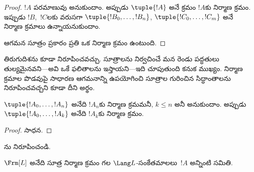 \documentclass[../../../include/open-logic-section]{subfiles}
\begin{document}
\begin{proof}
$!A$ పరమాణువు అనుకుందాం. అప్పుడు $\tuple{!A}$ అనే క్రమం $!A$కు
నిర్మాణ క్రమం.
%
ఇప్పుడు $!B$,~$!C$లకు వరుసగా $\tuple{!B_0,\dotsc,!B_n}$,
$\tuple{!C_0,\dotsc,!C_m}$ అనే నిర్మాణ క్రమాలు ఉన్నాయనుకుందాం.
%
\begin{enumerate}
\end{enumerate}
 ఆగమన సూత్రం ప్రకారం ప్రతి  ఒక నిర్మాణ
క్రమం ఉంటుంది.
\end{proof}

తిరుగుదిశను కూడా నిరూపించవచ్చు. సూత్రాలను నిర్వచించే మన రెండు
పద్ధతులు తుల్యమైనవని---అవి ఒకే ఫలితాలను ఇస్తాయని---ఇది చూపుతుంది
కనుక ముఖ్యం. నిర్మాణ క్రమాల పొడవుపై సాధారణ ఆగమనాన్ని ఉపయోగించి
సూత్రాల గురించిన సిద్ధాంతాలను నిరూపించవచ్చని కూడా దీని అర్థం.

\begin{lem}
$\tuple{!A_0,\dotsc,!A_n}$ అనేది $!A_n$కు నిర్మాణ క్రమమనీ,
$k \leq n$ అనీ అనుకుందాం. అప్పుడు $\tuple{!A_0,\dotsc,!A_k}$
అనేది $!A_k$కు నిర్మాణ క్రమం.
\end{lem}

\begin{proof}
సాధన.
\end{proof}

\begin{prob}
ను నిరూపించండి.
\end{prob}

\begin{thm}
$\Frm[L]$ అనేది సూత్ర నిర్మాణ క్రమం గల $\Lang L$-సంకేతమాలలు~$!A$ అన్నింటి సమితి.
\end{thm}
\end{document}
